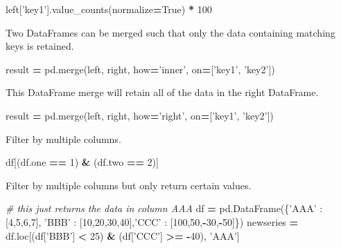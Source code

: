 \documentclass[]{book}
\newenvironment{Shaded}{\begin{snugshade}}{\end{snugshade}}
\newcommand{\DecValTok}[1]{\textcolor[rgb]{0.00,0.00,0.81}{#1}}
\newcommand{\StringTok}[1]{\textcolor[rgb]{0.31,0.60,0.02}{#1}}
\newcommand{\CommentTok}[1]{\textcolor[rgb]{0.56,0.35,0.01}{\textit{#1}}}
\newcommand{\VariableTok}[1]{\textcolor[rgb]{0.00,0.00,0.00}{#1}}
\newcommand{\OperatorTok}[1]{\textcolor[rgb]{0.81,0.36,0.00}{\textbf{#1}}}
\newcommand{\NormalTok}[1]{#1}
\begin{document}
\begin{Shaded}
\begin{Highlighting}[]
\NormalTok{left[}\StringTok{'key1'}\NormalTok{].value_counts(normalize}\OperatorTok{=}\VariableTok{True}\NormalTok{) }\OperatorTok{*} \DecValTok{100}
\end{Highlighting}
\end{Shaded}

Two DataFrames can be merged such that only the data containing matching
keys is retained.

\begin{Shaded}
\begin{Highlighting}[]
\NormalTok{result }\OperatorTok{=}\NormalTok{ pd.merge(left, right, how}\OperatorTok{=}\StringTok{'inner'}\NormalTok{, on}\OperatorTok{=}\NormalTok{[}\StringTok{'key1'}\NormalTok{, }\StringTok{'key2'}\NormalTok{])}
\end{Highlighting}
\end{Shaded}

This DataFrame merge will retain all of the data in the right DataFrame.

\begin{Shaded}
\begin{Highlighting}[]
\NormalTok{result }\OperatorTok{=}\NormalTok{ pd.merge(left, right, how}\OperatorTok{=}\StringTok{'right'}\NormalTok{, on}\OperatorTok{=}\NormalTok{[}\StringTok{'key1'}\NormalTok{, }\StringTok{'key2'}\NormalTok{])}
\end{Highlighting}
\end{Shaded}

Filter by multiple columns.

\begin{Shaded}
\begin{Highlighting}[]
\NormalTok{df[(df.one }\OperatorTok{==} \DecValTok{1}\NormalTok{) }\OperatorTok{&}\NormalTok{ (df.two }\OperatorTok{==} \DecValTok{2}\NormalTok{)]}
\end{Highlighting}
\end{Shaded}

Filter by multiple columns but only return certain values.

\begin{Shaded}
\begin{Highlighting}[]
\CommentTok{# this just returns the data in column AAA}
\NormalTok{df }\OperatorTok{=}\NormalTok{ pd.DataFrame(\{}\StringTok{'AAA'}\NormalTok{ : [}\DecValTok{4}\NormalTok{,}\DecValTok{5}\NormalTok{,}\DecValTok{6}\NormalTok{,}\DecValTok{7}\NormalTok{], }\StringTok{'BBB'}\NormalTok{ : [}\DecValTok{10}\NormalTok{,}\DecValTok{20}\NormalTok{,}\DecValTok{30}\NormalTok{,}\DecValTok{40}\NormalTok{],}\StringTok{'CCC'}\NormalTok{ : [}\DecValTok{100}\NormalTok{,}\DecValTok{50}\NormalTok{,}\OperatorTok{-}\DecValTok{30}\NormalTok{,}\OperatorTok{-}\DecValTok{50}\NormalTok{]\})}
\NormalTok{newseries }\OperatorTok{=}\NormalTok{ df.loc[(df[}\StringTok{'BBB'}\NormalTok{] }\OperatorTok{<} \DecValTok{25}\NormalTok{) }\OperatorTok{&}\NormalTok{ (df[}\StringTok{'CCC'}\NormalTok{] }\OperatorTok{>=} \OperatorTok{-}\DecValTok{40}\NormalTok{), }\StringTok{'AAA'}\NormalTok{]}
\end{Highlighting}
\end{Shaded}
\end{document}
